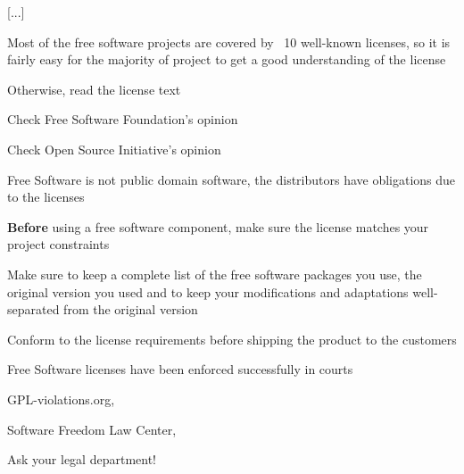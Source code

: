 [...]
\stoptyping

  \startitemize
  \item Most of the free software projects are covered by ~10
    well-known licenses, so it is fairly easy for the majority of
    project to get a good understanding of the license
  \item Otherwise, read the license text
  \item Check Free Software Foundation's opinion\\
  \item Check Open Source Initiative's opinion\\
  \stopitemize

  \startitemize
  \item Free Software is not public domain software, the distributors
    have obligations due to the licenses
    \startitemize
    \item {\bf Before} using a free software component, make sure the
      license matches your project constraints
    \item Make sure to keep a complete list of the free software
      packages you use, the original version you used and to keep your
      modifications and adaptations well-separated from the original
      version
    \item Conform to the license requirements before shipping the
      product to the customers
    \stopitemize
  \item Free Software licenses have been enforced successfully in
    courts
    \startitemize
    \item GPL-violations.org, 
    \item Software Freedom Law Center, 
    \stopitemize
  \item Ask your legal department!
  \stopitemize

